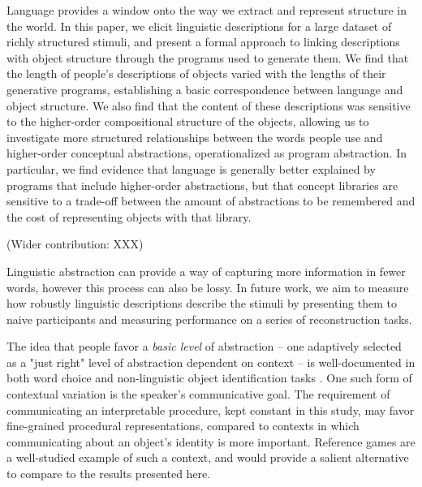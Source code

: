 \documentclass[10pt,letterpaper]{article}
\begin{document}
Language provides a window onto the way we extract and represent structure in the world.
In this paper, we elicit linguistic descriptions for a large dataset of richly structured stimuli, and present a formal approach to linking descriptions with object structure through the programs used to generate them.
We find that the length of people's descriptions of objects varied with the lengths of their generative programs, establishing a basic correspondence between language and object structure.
We also find that the content of these descriptions was sensitive to the higher-order compositional structure of the objects, allowing us to investigate more structured relationships between the words people use and higher-order conceptual abstractions, operationalized as program abstraction.
In particular, we find evidence that language is generally better explained by programs that include higher-order abstractions, but that concept libraries are sensitive to a trade-off between the amount of abstractions to be remembered and the cost of representing objects with that library.


(Wider contribution: XXX)




Linguistic abstraction can provide a way of capturing more information in fewer words, however this process can also be lossy.
In future work, we aim to measure how robustly linguistic descriptions describe the stimuli by presenting them to naive participants and measuring performance on a series of reconstruction tasks.



The idea that people favor a \textit{basic level} of abstraction -- one adaptively selected as a "just right" level of abstraction dependent on context -- is well-documented in both word choice and non-linguistic object identification tasks .
One such form of contextual variation is the speaker's communicative goal.
The requirement of communicating an interpretable procedure, kept constant in this study, may favor fine-grained procedural representations, compared to contexts in which communicating about an object's identity is more important.
Reference games are a well-studied example of such a context, and would provide a salient alternative to compare to the results presented here.
\end{document}
